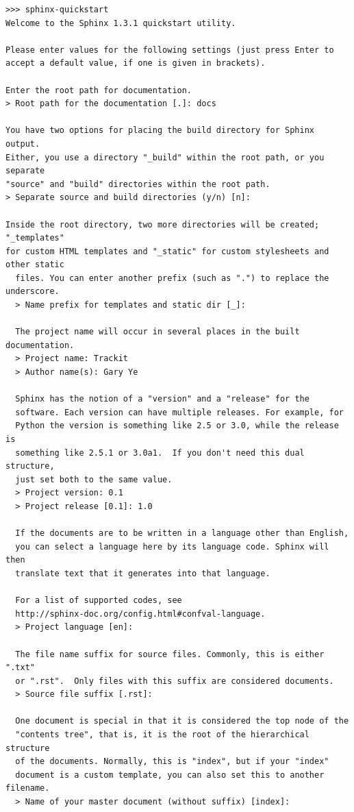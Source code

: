 \documentclass[../main/main.tex]{subfiles}
\begin{document}
\begin{lstlisting}[caption=Example Sphinx-Quickstart, label=lst:sphinx-quickstart]
>>> sphinx-quickstart
Welcome to the Sphinx 1.3.1 quickstart utility.

Please enter values for the following settings (just press Enter to
accept a default value, if one is given in brackets).

Enter the root path for documentation.
> Root path for the documentation [.]: docs

You have two options for placing the build directory for Sphinx output.
Either, you use a directory "_build" within the root path, or you separate
"source" and "build" directories within the root path.
> Separate source and build directories (y/n) [n]:

Inside the root directory, two more directories will be created; "_templates"
for custom HTML templates and "_static" for custom stylesheets and other static
  files. You can enter another prefix (such as ".") to replace the underscore.
  > Name prefix for templates and static dir [_]:

  The project name will occur in several places in the built documentation.
  > Project name: Trackit
  > Author name(s): Gary Ye

  Sphinx has the notion of a "version" and a "release" for the
  software. Each version can have multiple releases. For example, for
  Python the version is something like 2.5 or 3.0, while the release is
  something like 2.5.1 or 3.0a1.  If you don't need this dual structure,
  just set both to the same value.
  > Project version: 0.1
  > Project release [0.1]: 1.0

  If the documents are to be written in a language other than English,
  you can select a language here by its language code. Sphinx will then
  translate text that it generates into that language.

  For a list of supported codes, see
  http://sphinx-doc.org/config.html#confval-language.
  > Project language [en]:

  The file name suffix for source files. Commonly, this is either ".txt"
  or ".rst".  Only files with this suffix are considered documents.
  > Source file suffix [.rst]:

  One document is special in that it is considered the top node of the
  "contents tree", that is, it is the root of the hierarchical structure
  of the documents. Normally, this is "index", but if your "index"
  document is a custom template, you can also set this to another filename.
  > Name of your master document (without suffix) [index]:


\end{lstlisting}
\end{document}
